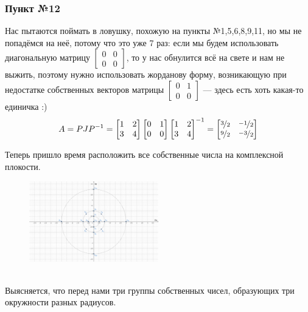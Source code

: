 \documentclass[a3paper,14pt]{extarticle}
\begin{document}
\subsubsection*{Пункт №12}
Нас пытаются поймать в ловушку, похожую на пункты №1,5,6,8,9,11, но мы не попадёмся на неё, потому что это уже 7 раз: если мы будем использовать диагональную матрицу $\left[\begin{smallmatrix}
    0 & 0 \\ 0 & 0
\end{smallmatrix}\right]$, то у нас обнулится всё на свете и нам не выжить, поэтому нужно использовать жорданову форму, возникающую при недостатке собственных векторов матрицы $\left[\begin{smallmatrix}
    0 & 1 \\ 0 & 0
\end{smallmatrix}\right]$ --- здесь есть хоть какая-то единичка :)
$$A = PJP^{-1} = \begin{bmatrix}
    1 & 2 \\ 3 & 4
\end{bmatrix}\begin{bmatrix}
    0 & 1 \\ 0 & 0
\end{bmatrix}\begin{bmatrix}
    1 & 2 \\ 3 & 4
\end{bmatrix}^{-1} = \begin{bmatrix}
    \nicefrac{3}{2} & \nicefrac{-1}{2} \\
    \nicefrac{9}{2} & \nicefrac{-3}{2}
\end{bmatrix}$$\pagebreak

\noindent Теперь пришло время расположить все собственные числа на комплексной плокости.
\begin{figure}[h]
    \centering\includegraphics[width=0.5\textwidth]{3.png}
\end{figure} \\
Выясняется, что перед нами три группы собственных чисел, образующих три окружности разных радиусов.\\[2em]
\end{document}
